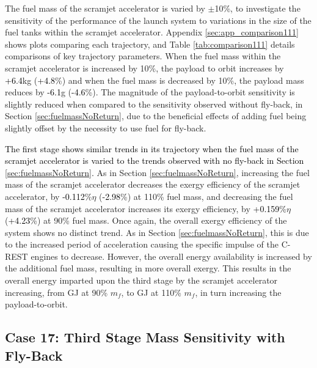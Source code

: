 \noindent	
The fuel mass of the scramjet accelerator is varied by $\pm$10\%, to investigate the sensitivity of the performance of the launch system to variations in the size of the fuel tanks within the scramjet accelerator. 
Appendix \ref{sec:app_comparison111} shows plots comparing each trajectory, and Table \ref{tab:comparison111} details comparisons of key trajectory parameters. 
When the fuel mass within the scramjet accelerator is increased by 10\%, the payload to orbit increases by \textcolor{black}{+6.4}kg (\textcolor{black}{+4.8}\%) and when the fuel mass is decreased by 10\%, the payload mass reduces by \textcolor{black}{-6.1}g (\textcolor{black}{-4.6}\%). The magnitude of the payload-to-orbit sensitivity is slightly reduced when compared to the sensitivity observed without fly-back, in Section \ref{sec:fuelmassNoReturn}, due to the beneficial effects of adding fuel being slightly offset by the necessity to use fuel for fly-back. 


\textcolor{black}{
The first stage shows similar trends in its trajectory when the fuel mass of the scramjet accelerator is varied to the trends observed with no fly-back in Section \ref{sec:fuelmassNoReturn}.}
As in Section \ref{sec:fuelmassNoReturn}, increasing the fuel mass of the scramjet accelerator decreases the exergy efficiency of the scramjet accelerator, by \textcolor{black}{-0.112}\%$\eta$ (\textcolor{black}{-2.98}\%) at 110\% fuel mass, and decreasing the fuel mass of the scramjet accelerator increases its exergy efficiency, by \textcolor{black}{+0.159}\%$\eta$ (\textcolor{black}{+4.23}\%) at 90\% fuel mass. Once again, the overall exergy efficiency of the system shows no distinct trend. 
As in Section \ref{sec:fuelmassNoReturn}, this is due to the increased period of acceleration causing the specific impulse of the C-REST engines to decrease. However, the overall energy availability is increased by the additional fuel mass, resulting in more overall exergy. This results in the overall energy imparted upon the third stage by the scramjet accelerator increasing, from \secondExergythirdStagemFuelNinety GJ at 90\% $m_{f}$, to \secondExergythirdStagemFuelOneHundredTen GJ at 110\% $m_{f}$, in turn increasing the payload-to-orbit.




\subsection{Case 17: Third Stage Mass Sensitivity with Fly-Back}

